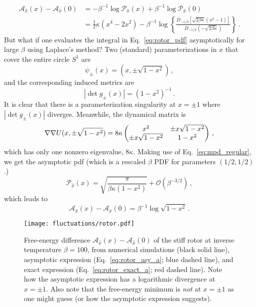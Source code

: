 \begin{subappendices}
\begin{equation}
\begin{aligned}
  \mathscr{A}_{\hat{x}}(x) - \mathscr{A}_{\hat{x}}(0) &= -\beta^{-1}\log{\mathscr{P}_{\hat{x}}(x)} +\beta^{-1}\log{\mathscr{P}_{\hat{x}}(0)}\\
                                                      &= \tfrac{1}{2}\kappa(x^4 - 2x^2) - \beta^{-1}\log\left\{\frac{D_{-1/2}\left[\sqrt{2\beta\kappa}(x^2-1)\right]}{D_{-1/2}\left(-\sqrt{2\beta\kappa}\right)}\right\}\,.
\end{aligned}
\end{equation}
But what if one evaluates the integral in Eq.~\eqref{eq:rotor_pdf} asymptotically for large $\beta$ using Laplace's method?
Two (standard) parameterizations in $x$ that cover the entire circle $S^1$ are
\begin{equation}
  \psi_{\pm}(x) = (x, \pm\sqrt{1 - x^2})\,,
\end{equation}
and the corresponding induced metrics are
\begin{equation}
  |\det g_{\pm}(x)| = (1-x^2)^{-1}\,.
\end{equation}
It is clear that there is a parameterization singularity at $x = \pm 1$ where $|\det g_{\pm}(x)|$ diverges.
Meanwhile, the dynamical matrix is
\begin{equation}
  \nabla\nabla U(x, \pm\sqrt{1-x^2}) = 8\kappa
  \begin{pmatrix}
    x^2 & \pm x\sqrt{1-x^2}\\
    \pm x\sqrt{1-x^2} & 1-x^2
  \end{pmatrix}\,,
\end{equation}
which has only one nonzero eigenvalue, $8\kappa$.
Making use of Eq.~\eqref{eq:mpd_regular}, we get the asymptotic \ac{pdf} (which is a rescaled $\beta$ PDF for parameters $(1/2, 1/2)$.)
\begin{equation}
  \mathscr{P}_{\hat{x}}(x) = \sqrt{\frac{\pi}{\beta\kappa(1-x^2)}} + \mathcal{O}(\beta^{-3/2})\,,
\end{equation}
which leads to
\begin{equation}\label{eq:rotor_asy_a}
  \mathscr{A}_{\hat{x}}(x) - \mathscr{A}_{\hat{x}}(0) = \beta^{-1}\log\sqrt{1-x^2}\,.
\end{equation}
\begin{figure}
  \begin{center}
    \texttt{[image: fluctuations/rotor.pdf]}
  \end{center}
  \caption{
    Free-energy difference $\mathscr{A}_{\hat{x}}(x) - \mathscr{A}_{\hat{x}}(0)$ of the stiff rotor at inverse temperature $\beta = 100$, from numerical simulations (black solid line), asymptotic expression (Eq.~\ref{eq:rotor_asy_a}; blue dashed line), and exact expression (Eq.~\ref{eq:rotor_exact_a}; red dashed line).
    Note how the asymptotic expression has a logarithmic divergence at $x = \pm 1$.
    Also note that the free-energy minimum is \emph{not} at $x = \pm 1$ as one might guess (or how the asymptotic expression suggests).
  }
  \label{fig:rotor}
\end{figure}

\end{subappendices}
